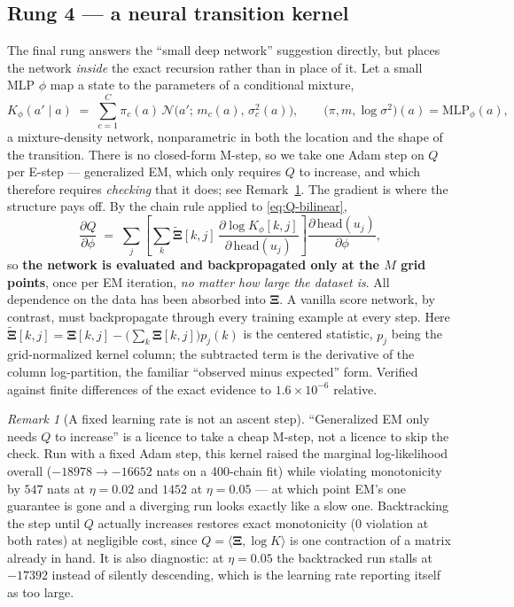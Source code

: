 \documentclass[11pt]{article}
\theoremstyle{remark}
\newtheorem{remark}{Remark}
\newcommand{\Normal}{\mathcal{N}}
\newcommand{\Xibf}{\bm{\Xi}}
\begin{document}
\subsection{Rung 4 --- a neural transition kernel}

The final rung answers the ``small deep network'' suggestion directly, but
places the network \emph{inside} the exact recursion rather than in place of it.
Let a small MLP $\phi$ map a state to the parameters of a conditional mixture,
\begin{equation}
  K_\phi(a' \mid a) \;=\; \sum_{c=1}^{C} \pi_c(a)\,
    \Normal\bigl(a';\, m_c(a),\, \sigma^2_c(a)\bigr),
  \qquad
  \bigl(\pi, m, \log\sigma^2\bigr)(a) = \mathrm{MLP}_\phi(a),
\end{equation}
a mixture-density network, nonparametric in both the location and the shape of
the transition. There is no closed-form M-step, so we take one Adam step on $Q$
per E-step --- generalized EM, which only requires $Q$ to increase, and which
therefore requires \emph{checking} that it does; see
Remark~\ref{rem:backtrack}. The gradient is where the structure pays off. By the
chain rule applied to \eqref{eq:Q-bilinear},
\begin{equation}
  \frac{\partial Q}{\partial \phi}
  \;=\;
  \sum_{j} \left[
    \sum_{k} \widetilde{\Xibf}[k,j]\,
      \frac{\partial \log K_\phi[k,j]}{\partial\, \mathrm{head}(u_j)}
  \right]
  \frac{\partial\, \mathrm{head}(u_j)}{\partial \phi},
  \label{eq:mdn-grad}
\end{equation}
so \textbf{the network is evaluated and backpropagated only at the $M$ grid
points}, once per EM iteration, \emph{no matter how large the dataset is}. All
dependence on the data has been absorbed into $\Xibf$. A vanilla score network,
by contrast, must backpropagate through every training example at every step.
Here $\widetilde{\Xibf}[k,j] = \Xibf[k,j] - \bigl(\sum_k \Xibf[k,j]\bigr) p_j(k)$
is the centered statistic, $p_j$ being the grid-normalized kernel column; the
subtracted term is the derivative of the column log-partition, the familiar
``observed minus expected'' form. Verified against finite differences of the
exact evidence to $1.6 \times 10^{-6}$ relative.

\begin{remark}[A fixed learning rate is not an ascent step]
\label{rem:backtrack}
``Generalized EM only needs $Q$ to increase'' is a licence to take a cheap
M-step, not a licence to skip the check. Run with a fixed Adam step, this kernel
raised the marginal log-likelihood overall ($-18978 \to -16652$ nats on a
400-chain fit) while violating monotonicity by $547$ nats at $\eta = 0.02$ and
$1452$ at $\eta = 0.05$ --- at which point EM's one guarantee is gone and a
diverging run looks exactly like a slow one. Backtracking the step until $Q$
actually increases restores exact monotonicity ($0$ violation at both rates) at
negligible cost, since $Q = \langle\Xibf, \log K\rangle$ is one contraction of a
matrix already in hand. It is also diagnostic: at $\eta = 0.05$ the backtracked
run stalls at $-17392$ instead of silently descending, which is the learning
rate reporting itself as too large.
\end{remark}
\end{document}
